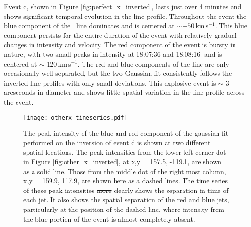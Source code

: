 		
		Event c, shown in Figure \ref{fig:perfect_x_inverted}, lasts just over 4 minutes and shows significant temporal evolution in the line profile.
		Throughout the event the blue component of the \ov \ line dominates and is centered at $\sim -50$\,km\,s$^{-1}$.
		This blue component persists for the entire duration of the event with %
		relatively gradual changes in intensity and velocity.
		The red component of the event is bursty in nature, with two small peaks in intensity at 18:07:36 and 18:08:16, and is centered at $\sim$ 120\,km\,s$^{-1}$. 
	    The red and blue components of the line are only occasionally well separated, but the two Gaussian fit consistently follows the inverted line profiles with only small deviations.
		This explosive event is $\sim$ 3 arcseconds in diameter and shows little spatial variation in the line profile across the event.
		
			\begin{figure}
				\texttt{[image: otherx\_timeseries.pdf]}
				\caption{The peak intensity of the blue and red component of the gaussian fit performed on the inversion of event d is shown at two different spatial locations.
				The peak intensities from the lower left corner dot in Figure \ref{fig:other_x_inverted}, at x,y = 157.5\arcsec, -119.1\arcsec, are shown as a solid line.
				Those from the middle dot of the right most column, x,y = 159.9\arcsec, 117.9\arcsec, are shown here as a dashed lines.
				The time series of these peak intensities \sout{more} clearly shows the separation in time of each jet.
				It also shows the spatial separation of the red and blue jets, particularly at the position of the dashed line, where intensity from the blue portion of the event is almost completely absent.
				}
				\label{fig:otherx_timeseries}
			\end{figure}
		
